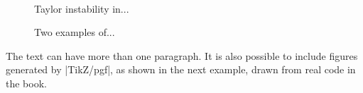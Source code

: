 \begin{dispListing}
\begin{teX}
\begin{figure}[htbp]
    \captionsetup[figure]{margin=10pt}%
    \hspace{1cm}
     \\[-10pt]
   \caption{Taylor instability in...}%
    \label{fig:Afirst}%
    \caption{Two examples of... }%
    \label{fig:honey}%
\end{figure}
\end{teX}


The text can have more than one paragraph. It is also possible to include figures
generated by |TikZ/pgf|, as shown in the next example, drawn from real code
in the book.


%




\end{dispListing}
